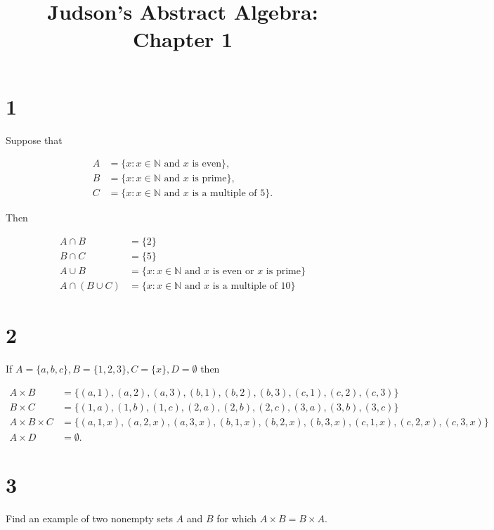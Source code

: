 \documentclass[a4paper]{article}
\title{Judson's Abstract Algebra: Chapter 1}
\date{}
\begin{document}
\maketitle

\section*{1}

Suppose that 

\begin{align*}
A &= \{ x : x \in \mathbb{N} \text{ and } x \text{ is even}\}, \\
B &= \{ x : x \in \mathbb{N} \text{ and } x \text{ is prime}\}, \\
C &= \{ x : x \in \mathbb{N} \text{ and } x \text{ is a multiple of 5}\}.
\end{align*}

Then

\begin{align*}
A \cap B &= \{ 2 \} \\
B \cap C &= \{ 5 \} \\
A \cup B &= \{ x : x \in \mathbb{N} \text{ and } x \text{ is even or } x \text{ is prime}\} \\
A \cap (B \cup C) &= \{ x : x \in \mathbb{N} \text{ and } x \text{ is a multiple of 10}\}
\end{align*}


\section*{2}

If $A = \{ a, b, c \}, B = \{ 1, 2, 3 \}, C = \{ x \}, D = \emptyset$ then

\begin{align*}
A \times B &= \{ (a,1), (a,2), (a,3), (b,1), (b,2), (b,3), (c,1), (c,2), (c,3)\} \\
B \times C &= \{ (1,a), (1,b), (1,c), (2,a), (2,b), (2,c), (3,a), (3,b), (3,c)\} \\
A \times B \times C &= \{ (a,1,x), (a,2,x), (a,3,x), (b,1,x), (b,2,x), (b,3,x), (c,1,x), (c,2,x), (c,3,x)\} \\
A \times D &= \emptyset.
\end{align*}


\section*{3}

Find an example of two nonempty sets $A$ and $B$ for which $A \times B = B \times A$.
\end{document}
